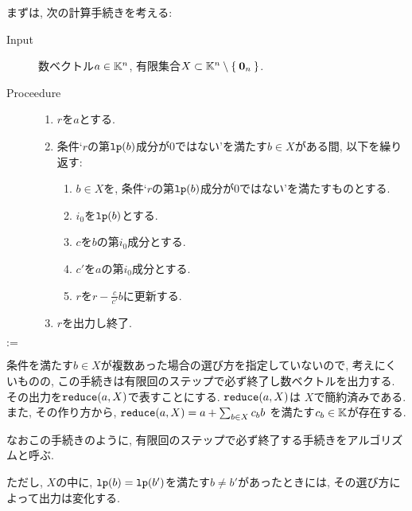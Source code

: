 まずは,
次の計算手続きを考える:
\begin{algorithm}\makebox{}
\begin{description}
\item[Input]
数ベクトル$a\in \mathbb{K}^n$,
有限集合$X\subset\mathbb{K}^n\setminus\Set{\boldsymbol{0}_n}$.
\item[Proceedure]\makebox{}
  \begin{enumerate}
  \item $r$を$a$とする.
  \item 条件`$r$の第$\operatorname{\texttt{lp}}(b)$成分が$0$ではない'を満たす$b\in X$がある間, 以下を繰り返す:
    \begin{enumerate}
    \item $b\in X$を, 条件`$r$の第$\operatorname{\texttt{lp}}(b)$成分が$0$ではない'を満たすものとする.
    \item $i_0$を$\operatorname{\texttt{lp}}(b)$とする.
    \item $c$を$b$の第$i_0$成分とする.
    \item $c'$を$a$の第$i_0$成分とする.
    \item $r$を$r-\frac{c}{c'}b$に更新する.
    \end{enumerate}
  \item $r$を出力し終了.
  \end{enumerate}
\end{description}
\end{algorithm}

\newcommand{\denotes}{\mathbin{:=}}
$\denotes$

条件を満たす$b\in X$が複数あった場合の選び方を指定していないので,
考えにくいものの,
この手続きは有限回のステップで必ず終了し数ベクトルを出力する.
その出力を$\operatorname{\texttt{reduce}}(a,X)$で表すことにする.
$\operatorname{\texttt{reduce}}(a,X)$は
$X$で簡約済みである.
また, その作り方から,
$\operatorname{\texttt{reduce}}(a,X)=a+\sum_{b\in X}c_{b} b$
を満たす$c_{b}\in\mathbb{K}$が存在する.
\begin{remark}
  なおこの手続きのように,
  有限回のステップで必ず終了する手続きをアルゴリズムと呼ぶ.
\end{remark}
ただし,
$X$の中に, $\operatorname{\texttt{lp}}(b)=\operatorname{\texttt{lp}}(b')$を満たす$b\neq b'$があったときには,
その選び方によって出力は変化する.
